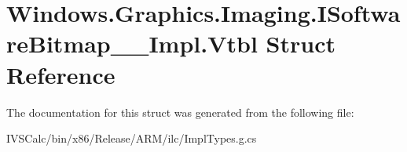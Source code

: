 \hypertarget{struct_windows_1_1_graphics_1_1_imaging_1_1_i_software_bitmap_____impl_1_1_vtbl}{}\section{Windows.\+Graphics.\+Imaging.\+I\+Software\+Bitmap\+\_\+\+\_\+\+Impl.\+Vtbl Struct Reference}
\label{struct_windows_1_1_graphics_1_1_imaging_1_1_i_software_bitmap_____impl_1_1_vtbl}


The documentation for this struct was generated from the following file\+:\begin{DoxyCompactItemize}
\item 
I\+V\+S\+Calc/bin/x86/\+Release/\+A\+R\+M/ilc/Impl\+Types.\+g.\+cs\end{DoxyCompactItemize}

